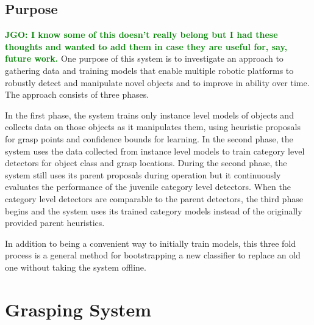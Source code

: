 \documentclass[graybox]{svmult}
\newcommand{\jgonote}[1]{\textcolor{green}{\textbf{JGO: #1}}}
\begin{document}
\subsection{Purpose}
\jgonote{I know some of this doesn't really belong but I had these thoughts
and wanted to add them in case they are useful for, say, future work.}
One purpose of this system is to investigate an approach to gathering data and
training models that enable multiple robotic platforms to robustly detect and
manipulate novel objects and to improve in ability over time. The approach
consists of three phases.

In the first phase, the system trains only instance level models of objects and
collects data on those objects as it manipulates them, using heuristic
proposals for grasp points and confidence bounds for learning. In the second
phase, the system uses the data collected from instance level models to train
category level detectors for object class and grasp locations. During the
second phase, the system still uses its parent proposals during operation but
it continuously evaluates the performance of the juvenile category level
detectors. When the category level detectors are comparable to the parent
detectors, the third phase begins and the system uses its trained category
models instead of the originally provided parent heuristics. 

In addition to being a convenient way to initially train models, this three
fold process is a general method for bootstrapping a new classifier to replace
an old one without taking the system offline.





\section{Grasping System}
\end{document}
